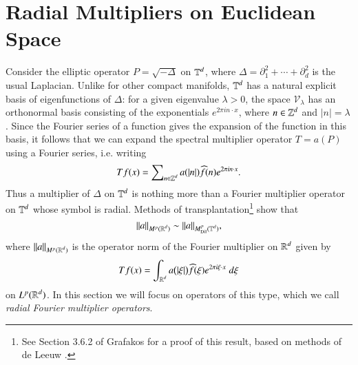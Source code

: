 %

%

\chapter{Radial Multipliers on Euclidean Space} \label{sec:radmult}

Consider the elliptic operator $P = \sqrt{-\Delta}$ on $\operatorname{\mathbb{T}}^d$, where $\Delta = \partial_1^2 + \cdots + \partial_d^2$ is the usual Laplacian. Unlike for other compact manifolds, $\operatorname{\mathbb{T}}^d$ has a natural explicit basis of eigenfunctions of $\Delta$: for a given eigenvalue $\lambda > 0$, the space $\mathcal{V}_\lambda$ has an orthonormal basis consisting of the exponentials $e^{2 \pi i n \cdot x}$, where $n \in \operatorname{\mathbb{Z}}^d$ and $|n| = \lambda$. Since the Fourier series of a function gives the expansion of the function in this basis, it follows that we can expand the spectral multiplier operator $T = a(P)$ using a Fourier series, i.e. writing
%
\begin{equation}
  Tf(x) = \sum\nolimits_{n \in \operatorname{\mathbb{Z}}^d} a( |n| ) \widehat{f}(n) e^{2 \pi i n \cdot x}.
\end{equation}
%
Thus a multiplier of $\Delta$ on $\operatorname{\mathbb{T}}^d$ is nothing more than a Fourier multiplier operator on $\operatorname{\mathbb{T}}^d$ whose symbol is radial. Methods of transplantation\footnote{See Section 3.6.2 of Grafakos \cite{Grafakos} for a proof of this result, based on methods of de Leeuw \cite{deLeeuw}.} show that
%
\begin{equation}
  \| a \|_{M^p(\operatorname{\mathbb{R}}^d)} \sim \| a \|_{M^p_{\text{Dil}}(\operatorname{\mathbb{T}}^d)},
\end{equation}
where $\| a \|_{M^p(\operatorname{\mathbb{R}}^d)}$ is the operator norm of the Fourier multiplier on $\operatorname{\mathbb{R}}^d$ given by
%
\begin{equation}
  Tf(x) = \int_{\operatorname{\mathbb{R}}^d} a \big(|\xi| \big) \widehat{f}(\xi) e^{2 \pi i \xi \cdot x}\; d\xi 
\end{equation}
%
on $L^p(\operatorname{\mathbb{R}}^d)$. In this section we will focus on operators of this type, which we call \emph{radial Fourier multiplier operators}.

